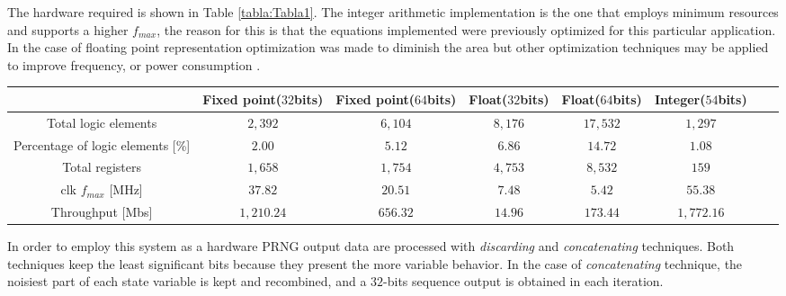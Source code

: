 The hardware required is shown in Table \ref{tabla:Tabla1}.
The integer arithmetic implementation is the one that employs minimum resources and supports a higher $f_{max}$, the reason for this is that the equations implemented were previously optimized for this particular application.
In the case of floating point representation optimization was made to diminish the area but other optimization techniques may be applied to improve frequency, or power consumption \cite{Giri2012,Gokul2004}.

\begin{table*} [tb]
\begin{center}
\caption{Compilation results CYCLONE III  EP3C120F780C7.}
\begin{tabular}{|c|c|c|c|c|c|c|c|}
\hline\hline
									&Fixed point($32$bits)	&Fixed point($64$bits)	&Float($32$bits)	&Float($64$bits)	&Integer($54$bits)  \\
\hline\hline
Total logic elements				&$2,392$    			&$6,104$     			&$8,176$   			&$17,532$  			&$1,297$			\\
\hline
Percentage of logic elements [\%] 	&$2.00$					&$5.12$     			&$6.86$            	&$14.72$          	&$1.08$   			\\
\hline
Total registers                  	&$1,658$            	&$1,754$       			&$4,753$     		&$8,532 $        	&$159$ 				\\
\hline \hline
clk $f_{max}$ [MHz]         		&$37.82$         		&$20.51$      			&$7.48$          	&$5.42$     		&$55.38$ 			\\
\hline
Throughput [Mbs]       				&$1,210.24$ 			&$656.32$         		&$14.96$          	&$173.44$          	&$1,772.16$   		\\
\hline\hline
\end{tabular}\end{center}
\label{tabla:Tabla1}
\end{table*}

In order to employ this system as a hardware PRNG output data are processed with \textit{discarding} and \textit{concatenating} techniques. 
Both techniques keep the least significant bits because they present the more variable behavior.
In the case of \textit{concatenating} technique, the noisiest part of each state variable is kept and recombined, and a $32$-bits sequence output is obtained in each iteration.

